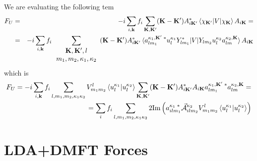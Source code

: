 \documentclass[aps,prb,floatfix,epsfig,singlecolumn,showpacs,preprintnumbers]{revtex4}
\newcommand{\vk}{{\mathbf{k}}}
\newcommand{\vK}{{\mathbf{K}}}
\renewcommand{\Im}{\textrm{Im}}
\newcommand{\vcA}{\vec{\cal A}}
\begin{document}
We are evaluating the following tem
\begin{eqnarray}
F_U&=&-i\sum_{i,\vk} f_i \sum_{\vK,\vK'}(\vK-\vK')  A_{i\vK'}^*\braket{\chi_{\vK'}|V|\chi_{\vK}} A_{i\vK}=\\
&=&-i\sum_{i,\vk}f_i \sum_{\begin{array}{c}\vK,\vK',l\\m_1,m_2,\kappa_1,\kappa_2\end{array}}(\vK-\vK')
  A_{i\vK'}^*\braket{a_{l
  m_1}^{\kappa_1,\vK'\;*}u_{l}^{\kappa_1}Y_{lm_1}^*|V|Y_{lm_2}u_l^{\kappa_2}a_{lm}^{\kappa_2,\vK}}
  A_{i\vK}
\nonumber
\end{eqnarray}
which is
\begin{eqnarray}
F_U=-i \sum_{i,\vk}f_i \sum_{l,m_1,m_2,\kappa_1\kappa_2}V^l_{m_1 m_2} \braket{u_{l}^{\kappa_1}|u_l^{\kappa_2}} 
\sum_{\vK,\vK'}(\vK-\vK')  
A_{i\vK'}^* A_{i\vK}
a_{l m_1}^{\kappa_1,\vK'\;*} a_{lm}^{\kappa_2,\vK}=\\
=\sum_i f_i \sum_{l,m_1,m_2,\kappa_1\kappa_2} 
2\Im\left(
a_{i l m_1}^{\kappa_1\;*}\vcA_{i l m_2}^{\kappa_2}
V^l_{m_1 m_2} \braket{u_{l}^{\kappa_1}|u_l^{\kappa_2}} 
\right)
\label{Eq:160}
\end{eqnarray}

\section{LDA+DMFT Forces}
\end{document}
